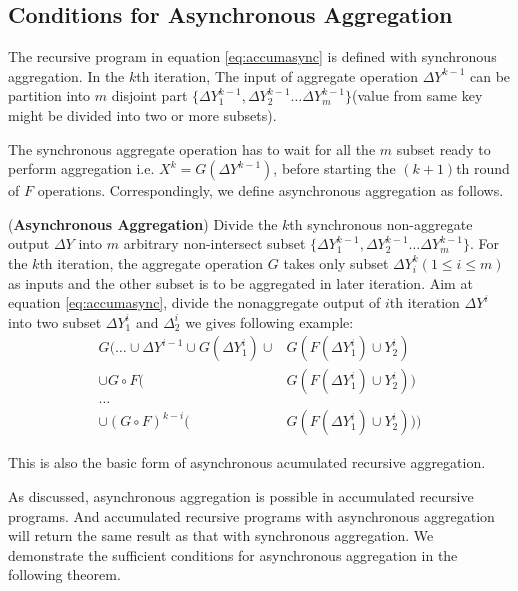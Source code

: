 {\subsection{Conditions for Asynchronous Aggregation}
\label{sec:async:condition}
The recursive program in equation \ref{eq:accumasync} is defined with synchronous aggregation. 
In the $k$th iteration, The input of aggregate operation  $\Delta Y^{k-1}$ can be partition into $m$ disjoint part $\{\Delta Y_1^{k-1},\Delta Y_2^{k-1}\ldots \Delta Y_m^{k-1} \}$(value from same key might be divided into two or more subsets).
 
The synchronous aggregate operation has to wait for all the $m$ subset ready to perform aggregation i.e. $X^k=G(\Delta Y^{k-1})$, before starting the $(k+1)$th round of $F$ operations.  Correspondingly, we define asynchronous aggregation as follows.
\begin{definition}(\textbf{Asynchronous Aggregation})
	\label{def:asyncaggre}
	Divide the $k$th synchronous non-aggregate output $\Delta Y$ into $m$ arbitrary non-intersect subset $\{\Delta Y_1^{k-1},\Delta Y_2^{k-1}\ldots \Delta Y_m^{k-1} \}$. For the $k$th iteration, the aggregate operation $G$ takes only subset $\Delta Y_{i}^k(1\le i\le m)$ as inputs and the other subset is to be aggregated in later iteration.
     Aim at equation \ref{eq:accumasync}, divide the nonaggregate output of $i$th iteration $\Delta Y^i$ into two subset $\Delta Y^i_1$ and $\Delta^i_2$ we gives following example:
     \begin{equation}
     \begin{aligned}
	G\big(\ldots \cup \Delta Y^{i-1}\cup G(\Delta Y^i_1)  \cup &G(F(\Delta Y^i_1)\cup Y^i_2)\\
	 \cup G\circ F(&G(F(\Delta Y^i_1)\cup Y^i_2)) \\
	\ldots\\
	\cup (G\circ F)^{k-i}(&G(F(\Delta Y^i_1)\cup Y^i_2))\big)
	\end{aligned}
	\end{equation}
\end{definition}
This is also the basic form of asynchronous acumulated recursive aggregation. 

As discussed, asynchronous aggregation is possible in accumulated recursive programs. And accumulated recursive programs with asynchronous aggregation will return the same result as that with synchronous aggregation. We demonstrate the sufficient conditions for asynchronous aggregation in the following theorem.

}
